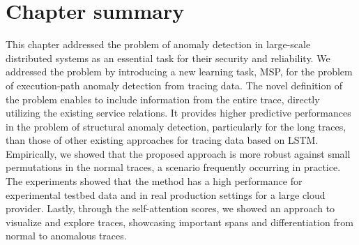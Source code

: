 \section{Chapter summary} \label{conclusion:traces}
This chapter addressed the problem of anomaly detection in large-scale distributed systems as an essential task for their security and reliability. We addressed the problem by introducing a new learning task, MSP, for the problem of execution-path anomaly detection from tracing data. The novel definition of the problem enables to include information from the entire trace, directly utilizing the existing service relations. It provides higher predictive performances in the problem of structural anomaly detection, particularly for the long traces, than those of other existing approaches for tracing data based on LSTM. Empirically, we showed that the proposed approach is more robust against small permutations in the normal traces, a scenario frequently occurring in practice. The experiments showed that the method has a high performance for experimental testbed data and in real production settings for a large cloud provider. Lastly, through the self-attention scores, we showed an approach to visualize and explore traces, showcasing important spans and differentiation from normal to anomalous traces.
